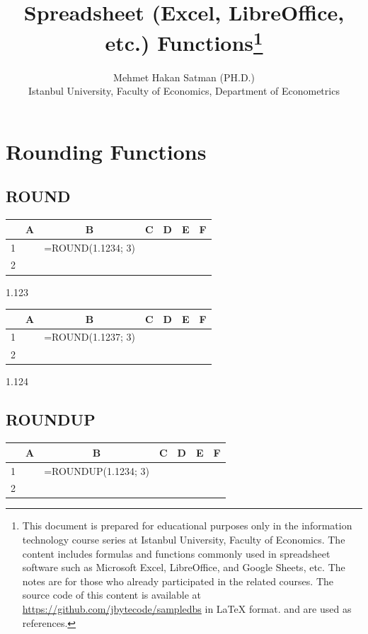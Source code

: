 \documentclass{article}
\title{Spreadsheet (Excel, LibreOffice, etc.) Functions\footnote{
   This document is prepared for educational purposes only in the 
   information technology course series at Istanbul University, Faculty of Economics.
   The content includes formulas and functions commonly used in spreadsheet software such 
   as Microsoft Excel, LibreOffice, and Google Sheets, etc. The notes are for those 
   who already participated in the related courses. The source code of this content 
   is available at \url{https://github.com/jbytecode/sampledbs} in \LaTeX \; format. 
   \cite{MicrosoftExcelSupport} and \cite{LibreOfficeDocumentation} are used as references.
}}
\author{Mehmet Hakan Satman (PH.D.)\\
  Istanbul University, Faculty of Economics, Department of Econometrics\\}
\begin{document}
\maketitle

\tableofcontents

\newcommand{\CE}[1]{\cellcolor{blue!15}#1}


\section{Rounding Functions}

\subsection{ROUND}
\begin{table}[H]
\centering
\begin{tabular}{|c|c|c|c|c|c|c|}
\hline
   \CE{ } & \CE{A} & \CE{B} & \CE{C} & \CE{D} & \CE{E} & \CE{F}  \\
\hline
 \CE{1} &  & =ROUND(1.1234; 3)  &  &  &  &  \\
\hline
 \CE{2} &  &  &  &  &  &  \\
\end{tabular}
\end{table}

\begin{tcolorbox}
   1.123
\end{tcolorbox}

\begin{table}[H]
\centering
\begin{tabular}{|c|c|c|c|c|c|c|}
\hline
   \CE{ } & \CE{A} & \CE{B} & \CE{C} & \CE{D} & \CE{E} & \CE{F}  \\
\hline
 \CE{1} &  & =ROUND(1.1237; 3)  &  &  &  &  \\
\hline
 \CE{2} &  &  &  &  &  &  \\
\end{tabular}
\end{table}

\begin{tcolorbox}
   1.124
\end{tcolorbox}


\subsection{ROUNDUP}
\begin{table}[H]
\centering
\begin{tabular}{|c|c|c|c|c|c|c|}
\hline
   \CE{ } & \CE{A} & \CE{B} & \CE{C} & \CE{D} & \CE{E} & \CE{F}  \\
\hline
 \CE{1} &  & =ROUNDUP(1.1234; 3)  &  &  &  &  \\
\hline
 \CE{2} &  &  &  &  &  &  \\
\end{tabular}
\end{table}
\end{document}
